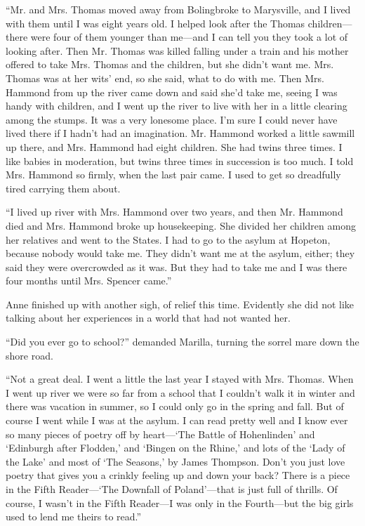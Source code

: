 \documentclass[a4paper]{article}
\begin{document}
{``Mr. and Mrs. Thomas moved away from Bolingbroke to Marysville, and I lived with them until I was eight years old. I helped look after the Thomas children---there were four of them younger than me---and I can tell you they took a lot of looking after. Then Mr. Thomas was killed falling under a train and his mother offered to take Mrs. Thomas and the children, but she didn't want me. Mrs. Thomas was at her wits' end, so she said, what to do with me. Then Mrs. Hammond from up the river came down and said she'd take me, seeing I was handy with children, and I went up the river to live with her in a little clearing among the stumps. It was a very lonesome place. I'm sure I could never have lived there if I hadn't had an imagination. Mr. Hammond worked a little sawmill up there, and Mrs. Hammond had eight children. She had twins three times. I like babies in moderation, but twins three times in succession is too much. I told Mrs. Hammond so firmly, when the last pair came. I used to get so dreadfully tired carrying them about.}

\Huge{``I lived up river with Mrs. Hammond over two years, and then Mr. Hammond died and Mrs. Hammond broke up housekeeping. She divided her children among her relatives and went to the States. I had to go to the asylum at Hopeton, because nobody would take me. They didn't want me at the asylum, either; they said they were overcrowded as it was. But they had to take me and I was there four months until Mrs. Spencer came.''

Anne finished up with another sigh, of relief this time. Evidently she did not like talking about her experiences in a world that had not wanted her.

``Did you ever go to school?'' demanded Marilla, turning the sorrel mare down the shore road.

``Not a great deal. I went a little the last year I stayed with Mrs. Thomas. When I went up river we were so far from a school that I couldn't walk it in winter and there was vacation in summer, so I could only go in the spring and fall. But of course I went while I was at the asylum. I can read pretty well and I know ever so many pieces of poetry off by heart---`The Battle of Hohenlinden' and `Edinburgh after Flodden,' and `Bingen on the Rhine,' and lots of the `Lady of the Lake' and most of `The Seasons,' by James Thompson. Don't you just love poetry that gives you a crinkly feeling up and down your back? There is a piece in the Fifth Reader---`The Downfall of Poland'---that is just full of thrills. Of course, I wasn't in the Fifth Reader---I was only in the Fourth---but the big girls used to lend me theirs to read.''}
\end{document}
